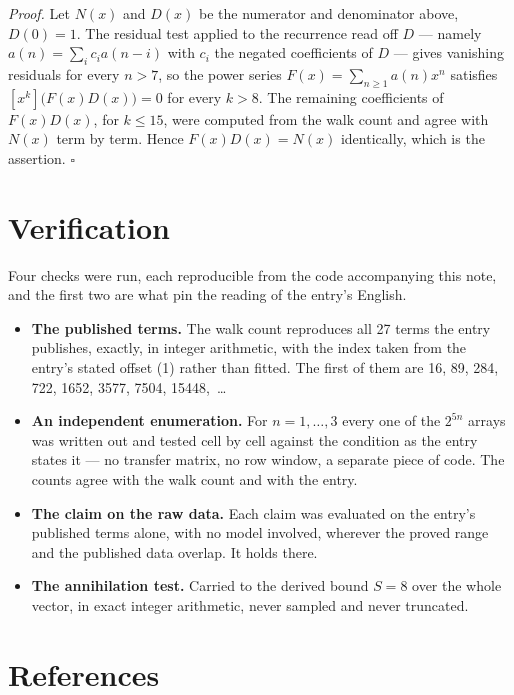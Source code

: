 \documentclass[11pt]{article}
\theoremstyle{definition}
\begin{document}
{\itshape Proof.} Let $N(x)$ and $D(x)$ be the numerator and denominator above, $D(0)=1$. The residual test applied to the recurrence read off $D$ --- namely $a(n) = \sum_i c_i a(n-i)$ with $c_i$ the negated coefficients of $D$ --- gives vanishing residuals for every $n > 7$, so the power series $F(x)=\sum_{n\ge 1}a(n)x^n$ satisfies $[x^k]\bigl(F(x)D(x)\bigr) = 0$ for every $k > 8$. The remaining coefficients of $F(x)D(x)$, for $k \le 15$, were computed from the walk count and agree with $N(x)$ term by term. Hence $F(x)D(x) = N(x)$ identically, which is the assertion. $\square$

\section{Verification}

Four checks were run, each reproducible from the code accompanying this note, and the first two are what pin the reading of the entry's English.

\begin{itemize}

\item {\bfseries The published terms.} The walk count reproduces all 27 terms the entry publishes, exactly, in integer arithmetic, with the index taken from the entry's stated offset (1) rather than fitted. The first of them are 16, 89, 284, 722, 1652, 3577, 7504, 15448,~\dots

\item {\bfseries An independent enumeration.} For $n = 1,\dots,3$ every one of the $2^{5n}$ arrays was written out and tested cell by cell against the condition as the entry states it --- no transfer matrix, no row window, a separate piece of code. The counts agree with the walk count and with the entry.

\item {\bfseries The claim on the raw data.} Each claim was evaluated on the entry's published terms alone, with no model involved, wherever the proved range and the published data overlap. It holds there.

\item {\bfseries The annihilation test.} Carried to the derived bound $S = 8$ over the whole vector, in exact integer arithmetic, never sampled and never truncated.

\end{itemize}

\section{References}
\end{document}
